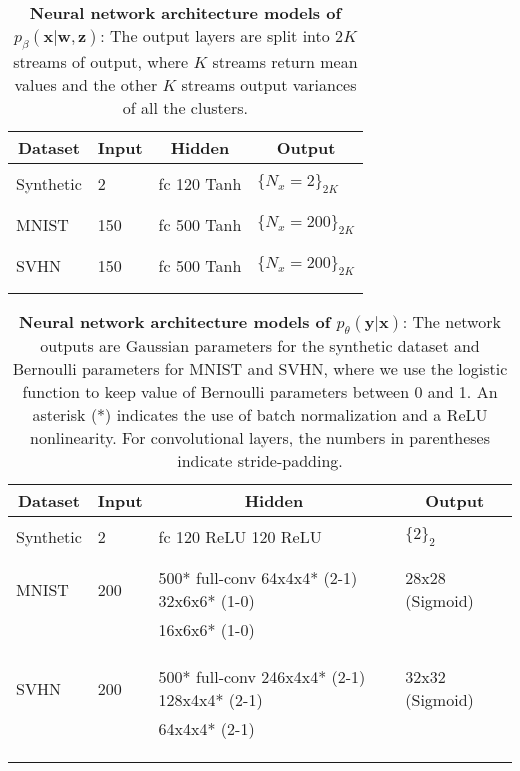 \documentclass{article} \usepackage{iclr2017_conference,times}
\begin{document}
\begin{table}[ht]
\caption{\textbf{Neural network architecture models of $p_{\beta}(\pmb{x}| \pmb{w}, \pmb{z})$}: The output layers are split into $2K$ streams of output, where $K$ streams return mean values and the other $K$ streams output variances of all the clusters.}
\label{table:architecture2}
\centering
\begin{tabular}{llll}
\multicolumn{1}{c}{\bf Dataset} &\multicolumn{1}{c}{\bf Input}  &\multicolumn{1}{c}{\bf Hidden}		&\multicolumn{1}{c}{\bf Output }
\\ \hline \\
Synthetic  & 2  &  fc 120 Tanh  &   $\{ N_x = 2\}_{2K}$  \\
\\ \hline \\
MNIST  &150 & fc 500 Tanh &   $\{ N_x = 200\}_{2K}$\\
\\	\hline \\
SVHN  &150 & fc 500 Tanh  &   $\{ N_x = 200\}_{2K}$ \\

\\ \hline \\
\end{tabular}
\end{table}

\begin{table}[ht]
\caption{\textbf{Neural network architecture models of $p_{\theta}(\pmb{y}| \pmb{x})$}: The network outputs are Gaussian parameters for the synthetic dataset and Bernoulli parameters for MNIST and SVHN, where we use the logistic function to keep value of Bernoulli parameters between 0 and 1. An asterisk (*) indicates the use of batch normalization and a ReLU nonlinearity. For convolutional layers, the numbers in parentheses indicate stride-padding.}
\label{table:architecture3}
\centering
\begin{tabular}{llll}
\multicolumn{1}{c}{\bf Dataset} &\multicolumn{1}{c}{\bf Input}  &\multicolumn{1}{c}{\bf Hidden}		&\multicolumn{1}{c}{\bf Output }
\\ \hline \\
Synthetic  & 2  &  fc 120 ReLU 120 ReLU 					            & $\{2\}_2$  \\
\\ \hline \\
MNIST  & 200 & 500* full-conv 64x4x4* (2-1) 32x6x6* (1-0)  & 28x28 (Sigmoid) \\
  		 & 		 & 		16x6x6* (1-0) 								 &	  \\
			 & &  												  					 &    \\
\\	\hline \\
SVHN  & 200 & 500* full-conv 246x4x4* (2-1) 128x4x4* (2-1)  &  32x32 (Sigmoid) \\
  		& & 	64x4x4* (2-1) 								 	&	  \\
			& &  											 								 &   \\
\\ \hline \\
\end{tabular}
\end{table}
\end{document}
